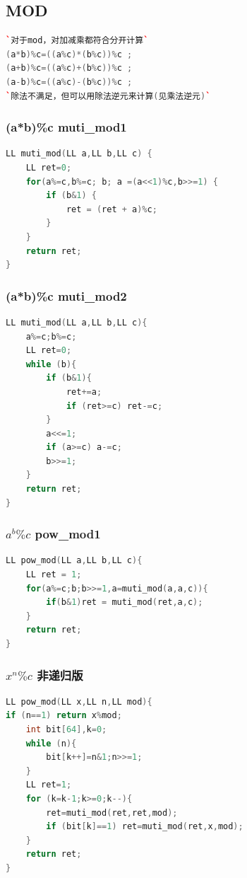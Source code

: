 \documentclass[a4paper]{article}
\begin{document}
\begin{CJK*}{UTF8}{gbsn}
\begin{multicols}{3}
\begin{flushleft}
\subsection{MOD}
\begin{lstlisting}[language={c++}]
`对于mod，对加减乘都符合分开计算`
(a*b)%c=((a%c)*(b%c))%c ;
(a+b)%c=((a%c)+(b%c))%c ;
(a-b)%c=((a%c)-(b%c))%c ;
`除法不满足，但可以用除法逆元来计算(见乘法逆元)`
\end{lstlisting}
 
\subsubsection{(a*b)\%c  muti\_mod1}
\begin{lstlisting}[language={c++}]
LL muti_mod(LL a,LL b,LL c) {
    LL ret=0;
    for(a%=c,b%=c; b; a =(a<<1)%c,b>>=1) {
        if (b&1) {
            ret = (ret + a)%c;
        }
    }
    return ret;
}
\end{lstlisting}

\subsubsection{(a*b)\%c  muti\_mod2}
\begin{lstlisting}[language={c++}]
LL muti_mod(LL a,LL b,LL c){        
	a%=c;b%=c;
    LL ret=0;
    while (b){
        if (b&1){
            ret+=a;
            if (ret>=c) ret-=c;
        }
        a<<=1;
        if (a>=c) a-=c;
        b>>=1;
    }
    return ret;
}
\end{lstlisting}

\subsubsection{$a^b\%c$ pow\_mod1}
\begin{lstlisting}[language={c++}]
LL pow_mod(LL a,LL b,LL c){
	LL ret = 1;
	for(a%=c;b;b>>=1,a=muti_mod(a,a,c)){
        if(b&1)ret = muti_mod(ret,a,c);
	}
	return ret;
}
\end{lstlisting}



\subsubsection{$x^{n}\%c$ 非递归版}
\begin{lstlisting}[language={c++}]
LL pow_mod(LL x,LL n,LL mod){     
if (n==1) return x%mod;
    int bit[64],k=0;
    while (n){
        bit[k++]=n&1;n>>=1;
    }
    LL ret=1;
    for (k=k-1;k>=0;k--){
        ret=muti_mod(ret,ret,mod);
        if (bit[k]==1) ret=muti_mod(ret,x,mod);
    }
    return ret;
}
\end{lstlisting}


\end{flushleft}
\end{multicols}
\end{CJK*}
\end{document}
